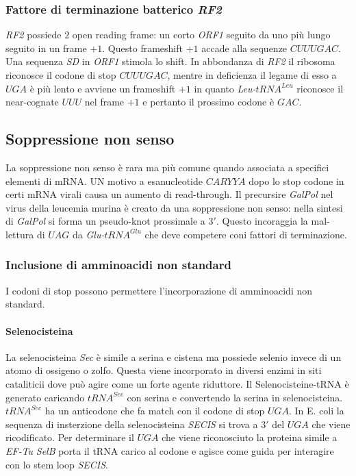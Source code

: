 \subsubsection{Fattore di terminazione batterico \emph{RF2}}
\emph{RF2} possiede $2$ open reading frame: un corto \emph{ORF1} seguito da uno pi\`u lungo seguito in un frame $+1$. Questo frameshift $+1$ accade alla sequenze $CUU UGA C$. Una
sequenza \emph{SD} in \emph{ORF1} stimola lo shift. In abbondanza di \emph{RF2} il ribosoma riconosce il codone di stop $CUUUGAC$, mentre in deficienza il legame di esso a $UGA$ 
\`e pi\`u lento e avviene un frameshift $+1$ in quanto \emph{Leu-$tRNA^{Leu}$} riconosce il near-cognate $UUU$ nel frame $+1$ e pertanto il prossimo codone \`e $GAC$. 
\subsection{Soppressione non senso}
La soppressione non senso \`e rara ma pi\`u comune quando associata a specifici elementi di mRNA. UN motivo a esanucleotide $CARYYA$ dopo lo stop codone in certi mRNA virali causa
un aumento di read-through. Il precursire \emph{GalPol} nel virus della leucemia murina \`e creato da una soppressione non senso: nella sintesi di \emph{GalPol} si forma un 
pseudo-knot prossimale a $3'$. Questo incoraggia la mal-lettura di $UAG$ da \emph{Glu-$tRNA^{Glu}$} che deve competere coni fattori di terminazione. 
\subsubsection{Inclusione di amminoacidi non standard}
I codoni di stop possono permettere l'incorporazione di amminoacidi non standard.
\paragraph{Selenocisteina}
La selenocisteina \emph{Sec} \`e simile a serina e cistena ma possiede selenio invece di un atomo di ossigeno o zolfo. Questa viene incorporato in diversi enzimi in siti cataliticii 
dove pu\`o agire come un forte agente riduttore. Il Selenocisteine-tRNA \`e generato caricando \emph{$tRNA^{Sec}$} con serina e convertendo la serina in selenocisteina. 
\emph{$tRNA^{Sec}$} ha un anticodone che fa match con il codone di stop $UGA$. In E. coli la sequenza di insterzione della selenocisteina \emph{SECIS} si trova a $3'$ del $UGA$ che viene 
ricodificato. Per determinare il $UGA$ che viene riconosciuto la proteina simile a \emph{EF-Tu} \emph{SelB} porta il tRNA carico al codone e agisce come guida per interagire con lo stem 
loop \emph{SECIS}. 
